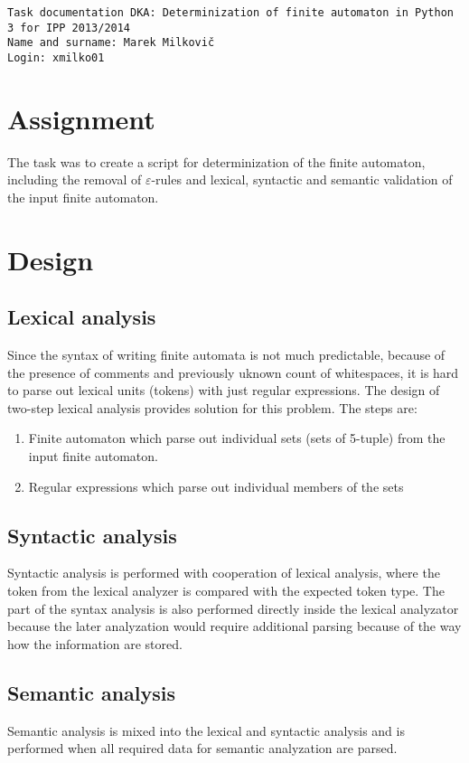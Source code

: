 \documentclass[12pt,a4paper,final]{article}
\begin{document}
\noindent
\texttt{Task documentation DKA: Determinization of finite automaton in Python 3 for IPP 2013/2014} \\
\texttt{Name and surname: Marek Milkovič} \\
\texttt{Login: xmilko01}

\section{Assignment}
The task was to create a script for determinization of the finite automaton, including the removal of $\varepsilon$-rules and lexical, syntactic and semantic validation of the input finite automaton.

\section{Design}
\subsection{Lexical analysis}
Since the syntax of writing finite automata is not much predictable, because of the presence of comments and previously uknown count of whitespaces, it is hard to parse out lexical units (tokens) with just regular expressions. The design of two-step lexical analysis provides solution for this problem. The steps are:
\begin{enumerate}
    \item Finite automaton which parse out individual sets (sets of 5-tuple) from the input finite automaton.
    \item Regular expressions which parse out individual members of the sets
\end{enumerate}
\subsection{Syntactic analysis}
Syntactic analysis is performed with cooperation of lexical analysis, where the token from the lexical analyzer is compared with the expected token type. The part of the syntax analysis is also performed directly inside the lexical analyzator because the later analyzation would require additional parsing because of the way how the information are stored.
\subsection{Semantic analysis}
Semantic analysis is mixed into the lexical and syntactic analysis and is performed when all required data for semantic analyzation are parsed.
\end{document}
